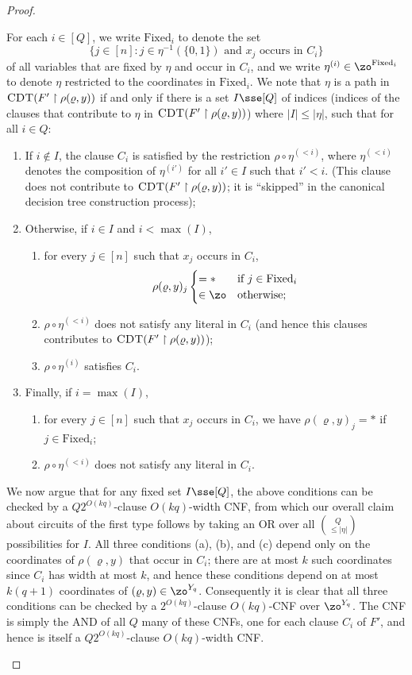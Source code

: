 \documentclass{toc}
\theoremstyle{plain}
\newcommand{\uhr}{\upharpoonright}
\newcommand{\CDT}{\textsc{CDT}}
\newcommand{\Fixed}{\mathrm{Fixed}}
\begin{document}
\begin{proof}
\begin{enumerate}
For each $i\in [Q]$, we write $\Fixed_i$ to denote the set 
\[ \{ j \in [n] \colon \text{$j \in \eta^{-1}(\{0,1\})$ and $x_j$ occurs in $C_i$}\}\]
of all variables that are fixed by $\eta$ and occur in $C_i$, and we write  $\eta^{(i)} \in \zo^{\Fixed_i}$ to denote $\eta$ restricted to the coordinates in $\Fixed_i$.  We note that $\eta$ is a path in $\CDT(F'\uhr \rho(\varrho,y))$ if and only if there is a set $I\sse [Q]$ of indices (indices of the clauses that contribute to $\eta$ in $\CDT(F'\uhr\rho(\varrho,y))$) where $|I|\le |\eta|$, such that for all $i \in Q$: 
\begin{enumerate}
\item[(a)] If $i \notin I$, the clause $C_i$ is satisfied by the restriction $\rho \circ \eta^{(< i)}$, where $\eta^{(<i)}$ denotes the composition of $\eta^{(i')}$ for all $i' \in I$ such that $i' < i$. (This clause does not contribute to $\CDT(F'\uhr \rho(\varrho,y))$; it is ``skipped'' in the canonical decision tree construction process); 
\item[(b)] Otherwise, if $i \in I$ and $i < \max(I)$, 
\begin{enumerate}
\item[(i)] for every $j \in [n]$ such that $x_j$ occurs in $C_i$, 
\[ \rho(\varrho,y)_j  \begin{cases}
= * & \text{if $j\in \Fixed_i$}  \\
\in \zo & \text{otherwise};
\end{cases} \] 
\item[(ii)] $\rho \circ \eta^{(<i)}$  does not satisfy any literal in $C_i$ (and hence this clauses contributes to $\CDT(F'\uhr\rho(\varrho,y))$);
\item[(iii)] $\rho\circ \eta^{(i)}$ satisfies $C_i$.
\end{enumerate}
\item[(c)] Finally, if $i = \max(I)$,
\begin{enumerate}
\item[(i)] for every $j\in [n]$ such that $x_j$ occurs in $C_i$, we have $\rho(\varrho,y)_j = *$ if $j \in \Fixed_i$;
\item[(ii)] $\rho\circ \eta^{(<i)}$ does not satisfy any literal in $C_i$.
\end{enumerate} 
\end{enumerate} 

We now argue that for any fixed set $I \sse [Q]$, the above conditions can be checked by a $Q2^{O(kq)}$-clause $O(kq)$-width CNF, from which our overall claim about circuits of the first type follows by taking an OR over all ${Q\choose \le |\eta|}$ possibilities for $I$.  All three conditions (a), (b), and (c) depend only on the coordinates of $\rho(\varrho,y)$ that occur in $C_i$; there are at most $k$ such coordinates since $C_i$ has width at most $k$, and hence these conditions depend on at most $k(q+1)$ coordinates of $(\varrho,y) \in \zo^{Y_q}$. Consequently it is clear that all three conditions can be checked by a $2^{O(kq)}$-clause $O(kq)$-CNF over $\zo^{Y_q}$.  The CNF is simply the AND of all $Q$ many of these CNFs, one for each clause $C_i$ of $F'$, and hence is itself a $Q2^{O(kq)}$-clause $O(kq)$-width CNF.


\end{enumerate}
\end{proof}
\end{document}
